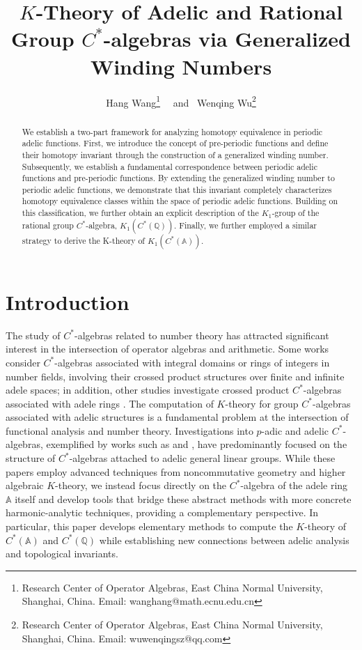 \documentclass[11pt]{article}
\title{$K$-Theory of Adelic and Rational Group $C^*$-algebras via Generalized Winding Numbers}
\author{Hang Wang\footnote{Research Center of Operator Algebras, East China Normal University, Shanghai, China. \newline Email: wanghang@math.ecnu.edu.cn} ~~and~ Wenqing Wu\footnote{Research Center of Operator Algebras, East China Normal University, Shanghai, China. \newline Email: wuwenqingsz@qq.com} }
\newcommand{\A}{\mathbb{A}}
\theoremstyle{remark}
\begin{document}
\maketitle
\begin{abstract}
    We establish a two-part framework for analyzing homotopy equivalence in periodic adelic functions. First, we introduce the concept of pre-periodic functions and define their homotopy invariant through the construction of a generalized winding number. Subsequently, we establish a fundamental correspondence between periodic adelic functions and pre-periodic functions. By extending the generalized winding number to periodic adelic functions, we demonstrate that this invariant completely characterizes homotopy equivalence classes within the space of periodic adelic functions. Building on this classification, we further obtain an explicit description of the $K_{1}$-group of the rational group $C^\ast$-algebra, $K_{1}(C^{*}(\mathbb{Q}))$. Finally, we further employed a similar strategy to derive the K-theory of \(K_1(C^{\ast}(\A))\).
\end{abstract}
\section{Introduction}
The study of $C^\ast$-algebras related to number theory has attracted significant interest in the intersection of operator algebras and arithmetic. Some works consider $C^*$-algebras associated with integral domains or rings of integers in number fields, involving their crossed product structures over finite and infinite adele spaces\cite{ref1,ref2}; in addition, other studies investigate crossed product $C^\ast$-algebras associated with adele rings \cite{ref3,ref4}. The computation of $K$-theory for group $C^*$-algebras associated with adelic structures is a fundamental problem at the intersection of functional analysis and number theory. Investigations into $p$-adic and adelic $C^*$-algebras, exemplified by works such as \cite{MR3300223} and \cite{MR883498}, have predominantly focused on the structure of $C^*$-algebras attached to adelic general linear groups.
While these papers employ advanced techniques from noncommutative geometry and higher algebraic $K$-theory, we instead focus directly on the $C^*$-algebra of the adele ring $\mathbb{A}$ itself and develop tools that bridge these abstract methods with more concrete harmonic-analytic techniques, providing a complementary perspective.
In particular, this paper develops elementary methods to compute the $K$-theory of $C^*(\mathbb{A})$ and $C^*(\mathbb{Q})$ while establishing new connections between adelic analysis and topological invariants.
\end{document}
